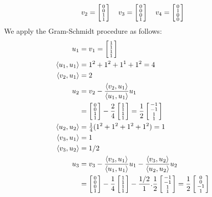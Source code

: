 \documentclass[a4paper]{article}
\begin{document}
\begin{solution}
\begin{itemize}
\[      v_2 = \left[\begin{smallmatrix} 0\\0\\1\\1\end{smallmatrix}\right] \hspace{1em}
      v_3 = \left[\begin{smallmatrix} 0\\0\\0\\1\end{smallmatrix}\right] \hspace{1em}
      v_4 = \left[\begin{smallmatrix} 0\\1\\0\\0\end{smallmatrix}\right] 
   \]
   We apply the Gram-Schmidt procedure as follows:
   \begin{align*}
    u_1 &= v_1 = \bsm 1\\1\\1\\1\esm \\
    \ip{u_1,u_1} &= 1^2+1^2+1^1+1^2 = 4 \\
    \ip{v_2,u_1} &= 2 \\ 
    u_2 &= v_2 - \frac{\ip{v_2,u_1}}{\ip{u_1,u_1}}u_1 \\
        &= \bsm 0\\0\\1\\1 \esm - \frac{2}{4}\bsm 1\\1\\1\\1\esm
         = \frac{1}{2}\bsm -1\\-1\\1\\1\esm \\
    \ip{u_2,u_2} &= \tfrac{1}{4}(1^2+1^2+1^2+1^2)=1 \\
    \ip{v_3,u_1} &= 1 \\
    \ip{v_3,u_2} &= 1/2 \\
    u_3 &= v_3 - \frac{\ip{v_3,u_1}}{\ip{u_1,u_1}}u_1 
               - \frac{\ip{v_3,u_2}}{\ip{u_2,u_2}}u_2  \\
        &= \bsm 0\\0\\0\\1 \esm - 
           \frac{1}{4} \bsm 1\\1\\1\\1 \esm -
           \frac{1/2}{1}.\frac{1}{2}\bsm -1\\-1\\1\\1\esm 
         = \frac{1}{2}\bsm 0\\0\\-1\\1\esm \\

\end{align*}
\end{itemize}
\end{solution}
\end{document}
